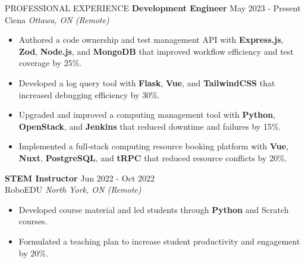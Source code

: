 \documentclass{resume}
\begin{document}
\begin{rSection}{PROFESSIONAL EXPERIENCE}
	\textbf{Development Engineer} \hfill May 2023 - Present \\ Ciena \hfill \textit{Ottawa, ON (Remote)}

	\begin{itemize}
		\itemsep -4pt {}
		\item Authored a code ownership and test management API with \textbf{Express.js}, \textbf{Zod}, \textbf{Node.js}, and \textbf{MongoDB} that improved workflow efficiency and test coverage by 25\%.
		\item Developed a log query tool with \textbf{Flask}, \textbf{Vue}, and \textbf{TailwindCSS} that increased debugging efficiency by 30\%.
		\item Upgraded and improved a computing management tool with \textbf{Python}, \textbf{OpenStack}, and \textbf{Jenkins} that reduced downtime and failures by 15\%.
		\item Implemented a full-stack computing resource booking platform with \textbf{Vue}, \textbf{Nuxt}, \textbf{PostgreSQL}, and \textbf{tRPC} that reduced resource conflicts by 20\%.
	\end{itemize}

	\textbf{STEM Instructor} \hfill Jun 2022 - Oct 2022 \\ RoboEDU \hfill \textit{North York, ON (Remote)}

	\begin{itemize}
		\itemsep -4pt {}
		\item Developed course material and led students through \textbf{Python} and Scratch courses.
		\item Formulated a teaching plan to increase student productivity and engagement by 20\%.
	\end{itemize}
\end{rSection}

\vspace{-8pt}
\end{document}
